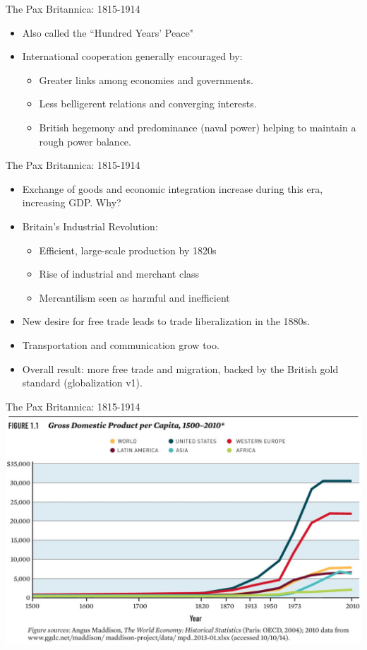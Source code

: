 \documentclass[handout]{beamer}
\begin{document}
\begin{frame}{\LARGE The Pax Britannica: 1815-1914}
	\begin{itemize}
		\item Also called the ``Hundred Years' Peace"
		\item International cooperation generally encouraged by:
		\begin{itemize}
			\item Greater links among economies and governments.
			\item Less belligerent relations and converging interests.
			\item British hegemony and predominance (naval power) helping to maintain a rough power balance.
		\end{itemize}
	\end{itemize}
\end{frame}

\begin{frame}{\LARGE The Pax Britannica: 1815-1914}
	\begin{itemize}
		\item Exchange of goods and economic integration increase during this era, increasing GDP. Why? \pause
		\item Britain's Industrial Revolution: \pause
		\begin{itemize}
			\item Efficient, large-scale production by 1820s
			\item Rise of industrial and merchant class
			\item Mercantilism seen as harmful and inefficient \pause
		\end{itemize}
		\item New desire for free trade leads to trade liberalization in the 1880s.
		\item Transportation and communication grow too.
		\item Overall result: more free trade and migration, backed by the British gold standard (globalization v1).	
	\end{itemize}
\end{frame}

\begin{frame}{\LARGE The Pax Britannica: 1815-1914}
	\centering
	\includegraphics[width=\textwidth,height=.9\textheight,keepaspectratio]{500yearGDP.jpg}	
\end{frame}
\end{document}

